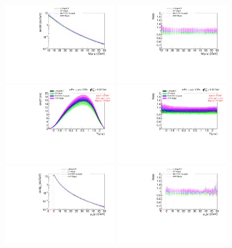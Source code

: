 \begin{figure}[h!]
\includegraphics[width=0.43\textwidth]{figures/Mll_inc_cut.pdf}
\includegraphics[width=0.43\textwidth]{figures/RatioMll_inc_cut.pdf}
\includegraphics[width=0.43\textwidth]{figures/Yll_inc_cut.pdf}
\includegraphics[width=0.43\textwidth]{figures/RatioYll_inc_cut.pdf}
\includegraphics[width=0.43\textwidth]{figures/pTl_inc_cut.pdf}
\includegraphics[width=0.43\textwidth]{figures/RatiopTl_inc_cut.pdf}

\end{figure}
